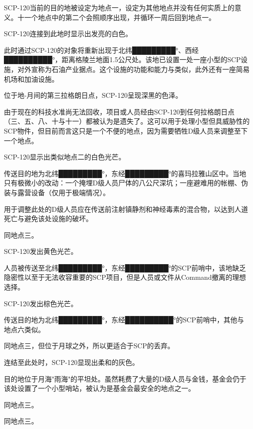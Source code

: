 SCP-120当前的目的地被设定为地点一，设定为其他地点并没有任何实质上的意义。十一个地点中的第二个会照顺序出现，并循环一周后回到地点一。

SCP-120连接到此地时显示出发亮的白色。

此时通过SCP-120的对象将重新出现于北纬█████████°、西经██████████°，距离格陵兰地面1.5公尺处。该地已设置一处一座小型的SCP设施，对外宣称为石油产业据点。这个设施的功能和能力与类似，此外还有一座简易机场和加油设施。

位于地-月间的第三拉格朗日点，SCP-120呈现深黑的色泽。

由于现在的科技水准尚无法回收，项目或人员经由SCP-120到任何拉格朗日点（三、五、八、十与十一）都被认为是遗失了。这可以用于处理小型但具威胁性的SCP物件，但目前而言这只是一个不便的地点，因为需要牺牲D级人员来调整至下一个地点。

SCP-120显示出类似地点二的白色光芒。

传送目的地为北纬█████████°，东经█████████°的喜玛拉雅山区中。当地只有极微小的改动：一个掩埋D级人员尸体的八公尺深坑；一座避难用的帐棚、伪装与露营设备（仅用于极端情况）。

用于调整此处的D级人员应在传送前注射镇静剂和神经毒素的混合物，以达到人道死亡与避免该处设施的破坏。

同地点三。

SCP-120发出黄色光芒。

人员被传送至北纬█████████°，东经█████████°的SCP前哨中，该地缺乏隐密性以至于无法收容重要的SCP项目，但是人员或文件从Command撤离的理想选择。

SCP-120发出棕色光芒。

传送目的地为北纬█████████°，东经██████████°的SCP前哨中，其他与地点六类似。

同地点三，但位于月球之外，所以更适合于SCP的丢弃。

连结至此处时，SCP-120显现出柔和的灰色。

目的地位于月海"雨海"的平坦处。虽然耗费了大量的D级人员与金钱，基金会仍于该处设置了一个小型哨站，被认为是基金会最安全的地点之一。

同地点三。

同地点三。
